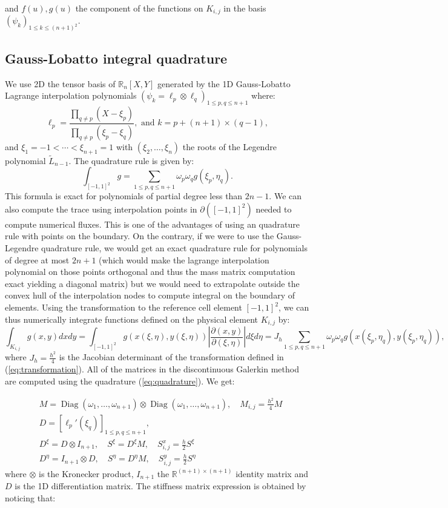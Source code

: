 \documentclass[10pt]{article}
\begin{document}
and \(f(u), g(u)\) the component of the functions on \(K_{i,j}\) in the basis \((\psi_k)_{1\leq k\leq (n+1)^2}\).

\subsection{Gauss-Lobatto integral quadrature}
We use 2D the tensor basis of \(\mathbb{R}_n[X,Y]\) generated by the 1D Gauss-Lobatto Lagrange interpolation polynomials \((\psi_k=\ell_p\otimes \ell_q)_{1\leq p,q\leq n+1}\) where:
\[\ell_p = \frac{\prod_{q\neq p} (X-\xi_p)}{\prod_{q\neq p} (\xi_p-\xi_q)},\text{ and }k=p+(n+1)\times (q-1),\]
and \(\xi_1 = -1 < \cdots < \xi_{n+1} = 1\) with \((\xi_2,\ldots, \xi_n)\) the roots of the Legendre polynomial \(\widetilde{L}_{n-1}\). The quadrature rule is given by:
\begin{equation}\label{eq:quadrature}
  \int_{[-1,1]^2} g = \sum_{1\leq p,q\leq n+1} \omega_p\omega_q g(\xi_p, \eta_q).
\end{equation}
This formula is exact for polynomials of partial degree less than \(2n-1\). We can also compute the trace using interpolation points in \(\partial([-1,1]^2)\) needed to compute numerical fluxes. This is one of the advantages of using an quadrature rule with points on the boundary. On the contrary, if we were to use the Gauss-Legendre quadrature rule, we would get an exact quadrature rule for polynomials of degree at most \(2n+1\) (which would make the lagrange interpolation polynomial on those points orthogonal and thus the mass matrix computation exact yielding a diagonal matrix) but we would need to extrapolate outside the convex hull of the interpolation nodes to compute integral on the boundary of elements. Using the transformation to the reference cell element \([-1,1]^2\), we can thus numerically integrate functions defined on the physical element \(K_{i,j}\) by:
\[\int_{K_{i,j}} g(x,y) dxdy = \int_{[-1,1]^2} g(x(\xi,\eta), y(\xi, \eta)) \left|\frac{\partial (x,y)}{\partial (\xi,\eta)}\right| d\xi d\eta = J_h\sum_{1\leq p,q\leq n+1} \omega_p\omega_qg(x(\xi_p,\eta_q), y(\xi_p, \eta_q)),\]
where \(J_h = \frac{h^2}4\) is the Jacobian determinant of the transformation defined in (\ref{eq:transformation}). All of the matrices in the discontinuous Galerkin method are computed using the quadrature (\ref{eq:quadrature}). We get:

\begin{align*}
  &M = \operatorname{Diag}(\omega_1,\ldots,\omega_{n+1})\otimes\operatorname{Diag}(\omega_1,\ldots,\omega_{n+1}),\quad M_{i,j} = \frac{h^2}4 M \\
  &D = [\ell_p'(\xi_q)]_{1\leq p,q\leq n+1}, \\
  &D^\xi = D\otimes I_{n+1},\quad S^\xi = D^\xi M, \quad S^x_{i,j} = \frac h2 S^\xi \\
  &D^\eta = I_{n+1}\otimes D,\quad S^\eta = D^\eta M, \quad S^y_{i,j} = \frac h2 S^\eta
\end{align*}
where \(\otimes\) is the Kronecker product, \(I_{n+1}\) the \(\mathbb{R}^{(n+1)\times(n+1)}\) identity matrix and \(D\) is the 1D differentiation matrix. The stiffness matrix expression is obtained by noticing that:
\end{document}

